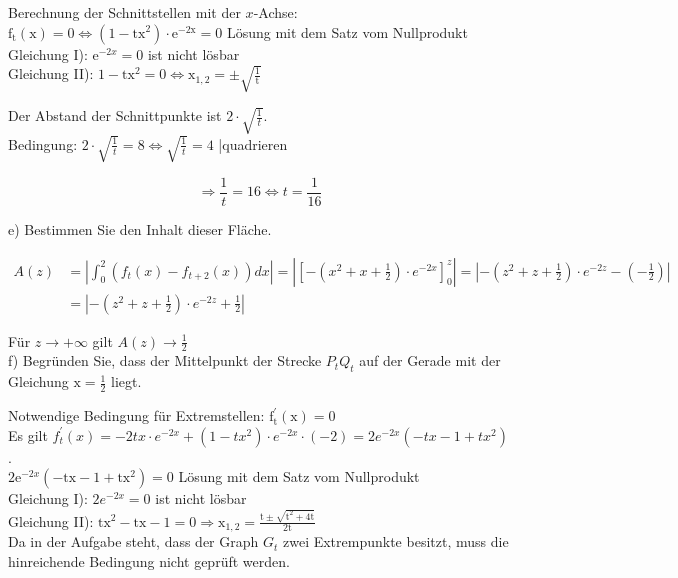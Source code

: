 \documentclass[10pt]{article}
\begin{document}
Berechnung der Schnittstellen mit der $x$-Achse: $\mathrm{f}_{\mathrm{t}}(\mathrm{x})=0 \Leftrightarrow\left(1-\mathrm{tx}^{2}\right) \cdot \mathrm{e}^{-2 \mathrm{x}}=0$ Lösung mit dem Satz vom Nullprodukt\\
Gleichung I): $\mathrm{e}^{-2 x}=0$ ist nicht lösbar\\
Gleichung II): $1-\mathrm{tx}^{2}=0 \Leftrightarrow \mathrm{x}_{1,2}= \pm \sqrt{\frac{1}{\mathrm{t}}}$

Der Abstand der Schnittpunkte ist $2 \cdot \sqrt{\frac{1}{t}}$.\\
Bedingung: $2 \cdot \sqrt{\frac{1}{t}}=8 \Leftrightarrow \sqrt{\frac{1}{t}}=4$ |quadrieren

$$
\Rightarrow \frac{1}{t}=16 \Leftrightarrow t=\frac{1}{16}
$$

e) Bestimmen Sie den Inhalt dieser Fläche.

$$
\begin{aligned}
A(z) & =\left|\int_{0}^{2}\left(f_{t}(x)-f_{t+2}(x)\right) d x\right|=\left|\left[-\left(x^{2}+x+\frac{1}{2}\right) \cdot e^{-2 x}\right]_{0}^{z}\right|=\left|-\left(z^{2}+z+\frac{1}{2}\right) \cdot e^{-2 z}-\left(-\frac{1}{2}\right)\right| \\
& =\left|-\left(z^{2}+z+\frac{1}{2}\right) \cdot e^{-2 z}+\frac{1}{2}\right|
\end{aligned}
$$

Für $z \rightarrow+\infty$ gilt $A(z) \rightarrow \frac{1}{2}$\\
f) Begründen Sie, dass der Mittelpunkt der Strecke $P_{t} Q_{t}$ auf der Gerade mit der Gleichung $\mathrm{x}=\frac{1}{2}$ liegt.

Notwendige Bedingung für Extremstellen: $\mathrm{f}_{\mathrm{t}}^{\prime}(\mathrm{x})=0$\\
Es gilt $f_{t}^{\prime}(x)=-2 t x \cdot e^{-2 x}+\left(1-t x^{2}\right) \cdot e^{-2 x} \cdot(-2)=2 e^{-2 x}\left(-t x-1+t x^{2}\right)$.\\
$2 \mathrm{e}^{-2 x}\left(-\mathrm{tx}-1+\mathrm{tx}^{2}\right)=0$ Lösung mit dem Satz vom Nullprodukt\\
Gleichung I): $2 e^{-2 x}=0$ ist nicht lösbar\\
Gleichung II): $\mathrm{tx}^{2}-\mathrm{tx}-1=0 \Rightarrow \mathrm{x}_{1,2}=\frac{\mathrm{t} \pm \sqrt{\mathrm{t}^{2}+4 \mathrm{t}}}{2 \mathrm{t}}$\\
Da in der Aufgabe steht, dass der Graph $G_{t}$ zwei Extrempunkte besitzt, muss die hinreichende Bedingung nicht geprüft werden.
\end{document}
